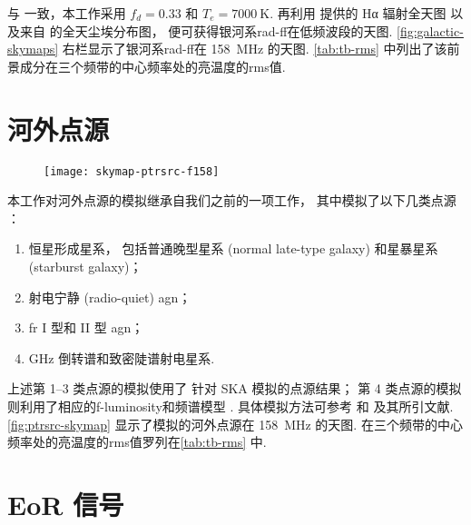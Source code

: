 与  一致，本工作采用 $f_d = 0.33$
和 $T_e = \SI{7000}{\kelvin}$.
再利用  提供的 Hα 辐射全天图
以及来自  的全天尘埃分布图，
便可获得银河系\ac{rad-ff}在低频波段的天图.
\autoref{fig:galactic-skymaps} 右栏显示了银河系\ac{rad-ff}在 \SI{158}{\MHz} 的天图.
\autoref{tab:tb-rms} 中列出了该前景成分在三个频带的中心频率处的亮温度的\ac{rms}值.


\section{河外点源}
\label{sec:simu-eg-point}

\begin{figure}[htp]
  \centering
  \texttt{[image: skymap-ptrsrc-f158]}
  \label{fig:ptrsrc-skymap}
\end{figure}

本工作对河外点源的模拟继承自我们之前的一项工作\cite{wang2010}，
其中模拟了以下几类点源 \cite{snellen2000,wilman2008,wang2010}：
\begin{enumerate}
  \item 恒星形成星系，
    包括普通晚型星系 (normal late-type galaxy) 和星暴星系 (starburst galaxy)；
  \item 射电宁静 (radio-quiet) \ac{agn}；
  \item \ac{fr} I 型和 II 型 \ac{agn}；
  \item GHz 倒转谱和致密陡谱射电星系.
\end{enumerate}
上述第 1--3 类点源的模拟使用了  针对 SKA 模拟的点源结果；
第 4 类点源的模拟则利用了相应的\ac{f-luminosity}和频谱模型
\cite{oDea1998,snellen1998,fanti2001}.
具体模拟方法可参考  和  及其所引文献.
\autoref{fig:ptrsrc-skymap} 显示了模拟的河外点源在 \SI{158}{\MHz} 的天图.
在三个频带的中心频率处的亮温度的\ac{rms}值罗列在\autoref{tab:tb-rms} 中.


\section{EoR 信号}
\label{sec:simu-eor}

